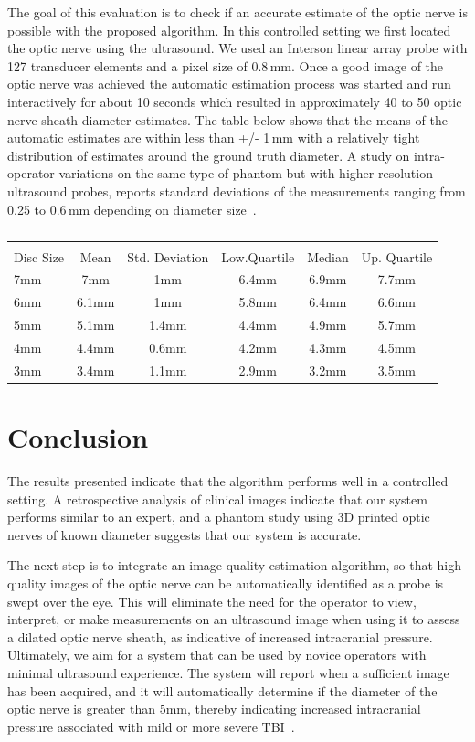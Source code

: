 \documentclass{llncs}
\begin{document}
The goal of this evaluation is to check if an accurate estimate of the optic
nerve is possible with the proposed algorithm. In this controlled setting we
first located the optic nerve using the ultrasound. We used an Interson linear
array probe with 127 transducer elements and a pixel size of 0.8\,mm.  Once a
good image of the optic nerve was achieved the automatic estimation process was
started and run interactively for about 10 seconds which resulted in
approximately 40 to 50 optic nerve sheath diameter estimates. The table below
shows that the means of the automatic estimates are within less than +/- 1\,mm
with a relatively tight distribution of estimates around the ground truth
diameter. A study on intra-operator variations on the same type of phantom but
with higher resolution ultrasound probes, reports standard deviations of the
measurements ranging from 0.25 to 0.6\,mm depending on diameter
size~\cite{Jo2016}.  
\begin{table}
\caption{
}
\label{tab:phantom}
\begin{tabular}{l|cc|ccc}
\\[-2.8ex] 
\hline  
\hline 
\\[-1.8ex]
Disc Size & Mean & Std. Deviation & Low.Quartile & Median & Up. Quartile \\
\hline
7mm & 7mm   & 1mm   & 6.4mm & 6.9mm & 7.7mm \\
6mm & 6.1mm & 1mm   & 5.8mm & 6.4mm & 6.6mm \\
5mm & 5.1mm & 1.4mm & 4.4mm & 4.9mm & 5.7mm \\
4mm & 4.4mm & 0.6mm & 4.2mm & 4.3mm & 4.5mm \\
3mm & 3.4mm & 1.1mm & 2.9mm & 3.2mm & 3.5mm \\
\hline 
\end{tabular}
\end{table}

\section{Conclusion}
The results presented indicate that the algorithm performs well in a controlled
setting.  A retrospective analysis of clinical images indicate that our system
performs similar to an expert, and a phantom study using 3D printed optic
nerves of known diameter suggests that our system is accurate.

The next step is to integrate an image quality estimation algorithm, so that
high quality images of the optic nerve can be automatically identified as a
probe is swept over the eye. This will eliminate the need for the operator to
view, interpret, or make measurements on an ultrasound image when using it to
assess a dilated optic nerve sheath, as indicative of increased intracranial
pressure. Ultimately, we aim for a system that can be used by novice operators
with minimal ultrasound experience. The system will report when a sufficient
image has been acquired, and it will automatically determine if the diameter of
the optic nerve is greater than 5mm, thereby indicating increased intracranial
pressure associated with mild or more severe TBI~\cite{Ma2015}.
\end{document}
